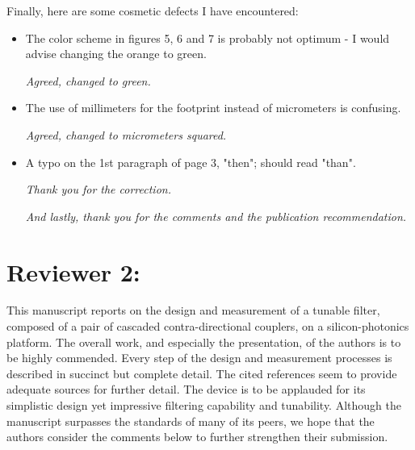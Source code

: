 \documentclass[]{article}
\begin{document}
Finally, here are some cosmetic defects I have encountered:
\begin{itemize}
\item The color scheme in figures 5, 6 and 7 is probably not optimum - I would advise changing the orange to green.

\emph{Agreed, changed to green.}

\item The use of millimeters for the footprint instead of micrometers is confusing.

\emph{Agreed, changed to micrometers squared.}

\item A typo on the 1st paragraph of page 3, "then"; should read "than".

\emph{Thank you for the correction.} 
	
\emph{And lastly, thank you for the comments and the publication recommendation.}

\end{itemize}


\section*{Reviewer 2:}
This manuscript reports on the design and measurement of a tunable filter, composed of a pair of cascaded contra-directional couplers, on a silicon-photonics platform. The overall work, and especially the presentation, of the authors is to be highly commended. Every step of the design and measurement processes is described in succinct but complete detail. The cited references seem to provide adequate sources for further detail. The device is to be applauded for its simplistic design yet impressive filtering capability and tunability. Although the manuscript surpasses the standards of many of its peers, we hope that the authors consider the comments below to further strengthen their submission.
\end{document}

